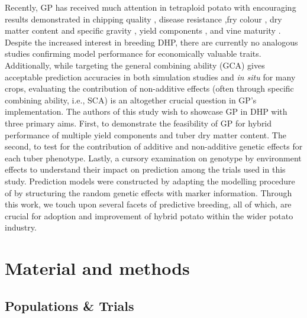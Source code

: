 \begin{refsection}
Recently, GP has received much attention in tetraploid potato with encouraging results demonstrated in chipping quality \parencite{Sverrisdottir2018, Pandey2022}, disease resistance \parencite{Enciso-Rodriguez2018, Ortiz2022},fry colour \parencite{Byrne2020}, dry matter content and specific gravity \parencite{Endelman2018, Sverrisdottir2018}, yield components \parencite{Endelman2018, Wilson2021, Ortiz2022, Cuevas2022}, and vine maturity \parencite{Slater2016, Pandey2022}. Despite the increased interest in breeding DHP, there are currently no analogous studies confirming model performance for economically valuable traits. Additionally, while targeting the general combining ability (GCA) gives acceptable prediction accuracies in both simulation studies and \textit{in situ} for many crops, evaluating the contribution of non-additive effects (often through specific combining ability, i.e., SCA) is an altogether crucial question in GP's implementation. The authors of this study wish to showcase GP in DHP with three primary aims. First, to demonstrate the feasibility of GP for hybrid performance of multiple yield components and tuber dry matter content. The second, to test for the contribution of additive and non-additive genetic effects for each tuber phenotype. Lastly, a cursory examination on genotype by environment effects to understand their impact on prediction among the trials used in this study. Prediction models were constructed by adapting the modelling procedure of \parencite{Adams2022} by structuring the random genetic effects with marker information. Through this work, we touch upon several facets of predictive breeding, all of which, are crucial for adoption and improvement of hybrid potato within the wider potato industry.


\section{Material and methods}

\subsection{Populations \& Trials}


\end{refsection}
